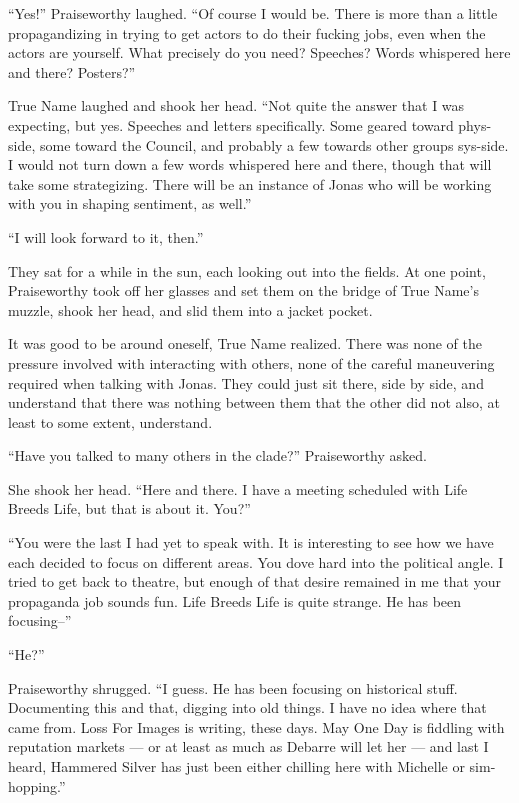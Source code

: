 ``Yes!'' Praiseworthy laughed. ``Of course I would be. There is more than a little propagandizing in trying to get actors to do their fucking jobs, even when the actors are yourself. What precisely do you need? Speeches? Words whispered here and there? Posters?''

True Name laughed and shook her head. ``Not quite the answer that I was expecting, but yes. Speeches and letters specifically. Some geared toward phys-side, some toward the Council, and probably a few towards other groups sys-side. I would not turn down a few words whispered here and there, though that will take some strategizing. There will be an instance of Jonas who will be working with you in shaping sentiment, as well.''

``I will look forward to it, then.''

They sat for a while in the sun, each looking out into the fields. At one point, Praiseworthy took off her glasses and set them on the bridge of True Name's muzzle, shook her head, and slid them into a jacket pocket.

It was good to be around oneself, True Name realized. There was none of the pressure involved with interacting with others, none of the careful maneuvering required when talking with Jonas. They could just sit there, side by side, and understand that there was nothing between them that the other did not also, at least to some extent, understand.

``Have you talked to many others in the clade?'' Praiseworthy asked.

She shook her head. ``Here and there. I have a meeting scheduled with Life Breeds Life, but that is about it. You?''

``You were the last I had yet to speak with. It is interesting to see how we have each decided to focus on different areas. You dove hard into the political angle. I tried to get back to theatre, but enough of that desire remained in me that your propaganda job sounds fun. Life Breeds Life is quite strange. He has been focusing--''

``He?''

Praiseworthy shrugged. ``I guess. He has been focusing on historical stuff. Documenting this and that, digging into old things. I have no idea where that came from. Loss For Images is writing, these days. May One Day is fiddling with reputation markets — or at least as much as Debarre will let her — and last I heard, Hammered Silver has just been either chilling here with Michelle or sim-hopping.''

